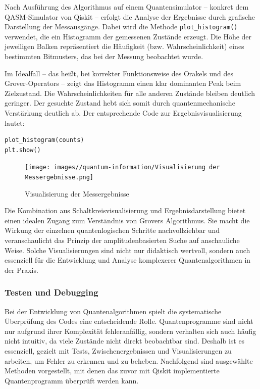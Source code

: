 Nach Ausführung des Algorithmus auf einem Quantensimulator – konkret dem QASM-Simulator von Qiskit – erfolgt die Analyse der Ergebnisse durch grafische Darstellung der Messausgänge.  Dabei wird die Methode \texttt{plot\_histogram()} verwendet, die ein Histogramm der gemessenen Zustände erzeugt.  Die Höhe der jeweiligen Balken repräsentiert die Häufigkeit (bzw. Wahrscheinlichkeit) eines bestimmten Bitmusters, das bei der Messung beobachtet wurde. 

Im Idealfall – das heißt, bei korrekter Funktionsweise des Orakels und des Grover-Operators – zeigt das Histogramm einen klar dominanten Peak beim Zielzustand.  Die Wahrscheinlichkeiten für alle anderen Zustände bleiben deutlich geringer.  Der gesuchte Zustand hebt sich somit durch quantenmechanische Verstärkung deutlich ab.  Der entsprechende Code zur Ergebnisvisualisierung lautet: 
\begin{verbatim}
plot_histogram(counts)
plt.show()
\end{verbatim}

\begin{figure}
    \centering
    \texttt{[image: images//quantum-information/Visualisierung der Messergebnisse.png]}
    \caption{Visualisierung der Messergebnisse}
    \label{fig:enter-label}
\end{figure}

Die Kombination aus Schaltkreisvisualisierung und Ergebnisdarstellung bietet einen idealen Zugang zum Verständnis von Grovers Algorithmus.  Sie macht die Wirkung der einzelnen quantenlogischen Schritte nachvollziehbar und veranschaulicht das Prinzip der amplitudenbasierten Suche auf anschauliche Weise.  Solche Visualisierungen sind nicht nur didaktisch wertvoll, sondern auch essenziell für die Entwicklung und Analyse komplexerer Quantenalgorithmen in der Praxis. 

\subsubsection{Testen und Debugging}

Bei der Entwicklung von Quantenalgorithmen spielt die systematische Überprüfung des Codes eine entscheidende Rolle. Quantenprogramme sind nicht nur aufgrund ihrer Komplexität fehleranfällig, sondern verhalten sich auch häufig nicht intuitiv, da viele Zustände nicht direkt beobachtbar sind. Deshalb ist es essenziell, gezielt mit Tests, Zwischenergebnissen und Visualisierungen zu arbeiten, um Fehler zu erkennen und zu beheben. Nachfolgend sind ausgewählte Methoden vorgestellt, mit denen das zuvor mit Qiskit implementierte Quantenprogramm überprüft werden kann.

